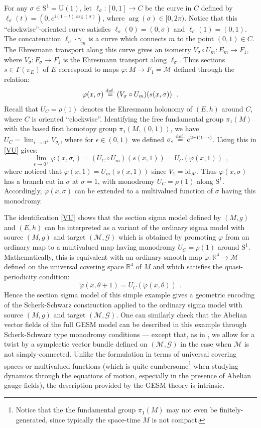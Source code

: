 \documentclass[10pt, cmp, numbook, final, a4paper]{svjour}
\newcommand*{\SavedEqref}{}
\let\SavedEqref\eqref
\renewcommand*{\eqref}[1]{%
  \begingroup
    \hypersetup{
      linkcolor=blue,
      linkbordercolor=blue,
    }%
    \SavedEqref{#1}%
  \endgroup
}
\newcommand{\eqdef}{\stackrel{{\rm def.}}{=}}
\def\R{\mathbb{R}}
\def\U{\mathrm{U}}
\newcommand{\be}{\begin{equation*}}
\newcommand{\ee}{\end{equation*}}
\newcommand{\ben}{\begin{equation}}
\newcommand{\een}{\end{equation}}
\newcommand{\id}{\mathrm{id}}
\newcommand{\cM}{\mathcal{M}}
\def\cG{\mathcal{G}}
\def\rS{\mathrm{S}}
\def\i{\mathbf{i}}
\def\tvarphi{{\tilde \varphi}}
\begin{document}
For any $\sigma\in \rS^1=\U(1)$, let $\ell_\sigma:[0,1]\rightarrow C$
be the curve in $C$ defined by $\ell_\sigma(t)=(0,e^{\i
  (1-t)\arg(\sigma) })$, where $\arg(\sigma)\in [0,2\pi)$. Notice that
  this ``clockwise''-oriented curve satisfies
  $\ell_\sigma(0)=(0,\sigma)$ and $\ell_\sigma(1)=(0,1)$. The
  concatenation $\ell_\sigma\cdot\gamma_m$ is a curve which connects
  $m$ to the point $(0,1)\in C$. The Ehresmann transport along this
  curve gives an isometry $V_\sigma\circ U_m:E_m\rightarrow F_1$,
  where $V_\sigma:F_\sigma \rightarrow F_1$ is the Ehresmann transport
  along $\ell_\sigma$. Thus sections $s\in \Gamma(\pi_E)$ of $E$
  correspond to maps $\varphi:M\rightarrow F_1=\cM$ defined through
  the relation:
\ben
\label{VU}
\varphi(x,\sigma)\eqdef (V_\sigma \circ U_m) (s(x,\sigma))~~.
\een
Recall that $U_C=\rho(1)$ denotes the Ehresmann holonomy of $(E,h)$
around $C$, where $C$ is oriented ``clockwise''. Identifying the free
fundamental group $\pi_1(M)$ with the based first homotopy group
$\pi_1(M,(0,1))$, we have $U_C=\lim_{\epsilon\rightarrow 0^+}
V_{\sigma_\epsilon}$, where for $\epsilon\in (0,1)$ we defined
$\sigma_\epsilon\eqdef e^{2\pi \i (1-\epsilon)}$. Using this in
\eqref{VU} gives:
\be
\lim_{\epsilon\rightarrow 0^+}\varphi(x,\sigma_\epsilon)=(U_C\circ U_m) (s(x,1))=U_C(\varphi(x,1))~~,
\ee
where noticed that $\varphi(x,1)=U_m (s(x,1))$ since
$V_1=\id_{\cM}$. Thus $\varphi(x,\sigma)$ has a branch cut in $\sigma$
at $\sigma=1$, with monodromy $U_C=\rho(1)$ along
$\rS^1$. Accordingly, $\varphi(x,\sigma)$ can be extended to a
multivalued function of $\sigma$ having this monodromy.

The identification \eqref{VU} shows that the section sigma model
defined by $(M,g)$ and $(E,h)$ can be interpreted as a variant of the
ordinary sigma model with source $(M,g)$ and target $(\cM,\cG)$ which
is obtained by promoting $\varphi$ from an ordinary map to a
multivalued map having monodromy $U_C=\rho(1)$ around
$\rS^1$. Mathematically, this is equivalent with an ordinary smooth
map $\tvarphi:\R^4\rightarrow \cM$ defined on the universal
covering space $\R^4$ of $M$ and which satisfies the quasi-periodicity
condition:
\ben
\label{phiper}
\tvarphi(x,\theta+1)=U_C(\tvarphi(x,\theta))~~.
\een
Hence the section sigma model of this simple example gives a geometric
encoding of the Scherk-Schwarz construction applied to the ordinary
sigma model with source $(M,g)$ and target $(\cM,\cG)$. One can
similarly check that the Abelian vector fields of the full GESM model
can be described in this example through Scherk-Schwarz type monodromy
conditions --- except that, as in
\cite{GESM,GESMNote,GeometricUfolds}, we allow for a twist by a
symplectic vector bundle defined on $(\cM,\cG)$ in the case when $\cM$
is not simply-connected. Unlike the formulation in terms of universal
covering spaces or multivalued functions (which is quite
cumbersome\footnote{Notice that the the fundamental group $\pi_1(M)$
may not even be finitely-generated, since typically the space-time $M$
is not compact.}  when studying dynamics through the equations of
motion, especially in the presence of Abelian gauge fields), the
description provided by the GESM theory is intrinsic.
\end{document}
